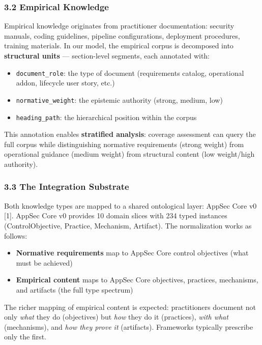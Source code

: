 \documentclass[
]{article}
\providecommand{\tightlist}{%
  \setlength{\itemsep}{0pt}\setlength{\parskip}{0pt}}
\begin{document}
\subsubsection{3.2 Empirical Knowledge}\label{empirical-knowledge}

Empirical knowledge originates from practitioner documentation: security
manuals, coding guidelines, pipeline configurations, deployment
procedures, training materials. In our model, the empirical corpus is
decomposed into \textbf{structural units} --- section-level segments,
each annotated with:

\begin{itemize}
\tightlist
\item
  \texttt{document\_role}: the type of document (requirements catalog,
  operational addon, lifecycle user story, etc.)
\item
  \texttt{normative\_weight}: the epistemic authority (strong, medium,
  low)
\item
  \texttt{heading\_path}: the hierarchical position within the corpus
\end{itemize}

This annotation enables \textbf{stratified analysis}: coverage
assessment can query the full corpus while distinguishing normative
requirements (strong weight) from operational guidance (medium weight)
from structural content (low weight/high authority).

\subsubsection{3.3 The Integration
Substrate}\label{the-integration-substrate}

Both knowledge types are mapped to a shared ontological layer: AppSec
Core v0 {[}1{]}. AppSec Core v0 provides 10 domain slices with 234 typed
instances (ControlObjective, Practice, Mechanism, Artifact). The
normalization works as follows:

\begin{itemize}
\tightlist
\item
  \textbf{Normative requirements} map to AppSec Core control objectives
  (what must be achieved)
\item
  \textbf{Empirical content} maps to AppSec Core objectives, practices,
  mechanisms, and artifacts (the full type spectrum)
\end{itemize}

The richer mapping of empirical content is expected: practitioners
document not only \emph{what} they do (objectives) but \emph{how} they
do it (practices), \emph{with what} (mechanisms), and \emph{how they
prove it} (artifacts). Frameworks typically prescribe only the first.
\end{document}
